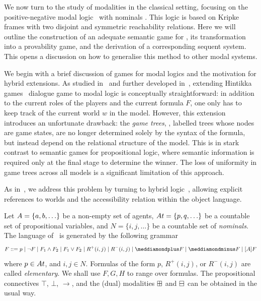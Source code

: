 
We now turn to the study of modalities in the classical setting, focusing on the positive-negative modal logic \PNL\ with nominals \cite{DBLP:journals/jolli/XiongA20,DBLP:journals/logcom/PedersenSA21}. This logic is based on Kripke frames with two disjoint and symmetric reachability relations. Here  we will outline the construction of an adequate semantic game for \PNL, its transformation into a provability game, and the derivation of a corresponding sequent system. This opens a discussion on how to generalise this method to other modal systems.

We begin with a brief discussion of games for modal logics and the motivation for hybrid extensions. As studied in~\cite{blackburn-synthese} and further developed in~\cite{Robert-PhD}, extending Hintikka games~\cite{Hintikka1973-HINLLA-2} dialogue game to modal logic is conceptually straightforward: in addition to the current roles of the players and the current formula $F$, one only has to  keep track of the current world $w$ in the model. However, this extension introduces an unfortunate drawback: the {\em game trees}, \ie, labelled trees whose nodes are game states, are no longer determined solely by the syntax of the formula, but instead depend on the relational structure of the model. This is in stark contrast to semantic games for propositional logic, where semantic information is required only at the final stage to determine the winner. The loss of uniformity in game trees across all models is a significant limitation of this approach.

As in~\cite{blackburn-synthese,DBLP:conf/wollic/Freiman21}, we address this problem by turning to hybrid logic~\cite{DBLP:journals/jolli/BlackburnS95,DBLP:journals/japll/BraunerP06,brauner2010hybrid}, allowing explicit references to worlds and the accessibility relation within the object language. 

Let $\A=\{\ag,\b,\ldots\}$ be a non-empty set of agents,
$\At=\{p,q,\ldots\}$ be a countable set of propositional variables, and $N=\{i,j,\ldots\}$ be a countable set of \emph{nominals}. The language of \PNL~is generated by the following grammar
$$F  ::= p  \mid \neg F  \mid F_1  \wedge F_2  \mid F_1  \vee F_2  \mid  R^+(i,j)\mid R^-(i,j) \mid  \dplus F  \mid \dminus F \mid [A]F $$
where $p\in \At$, and $i,j\in N$.  Formulas of the form $p$, $R^+(i,j)$, or $R^-(i,j)$ are called \emph{elementary}. We shall use $F,G,H$ to range over formulas. 
The propositional connectives $\top$, $\bot$, $\to$, and the (dual)  modalities $\boxplus$ and $\boxminus$ can be obtained in the usual way. 

